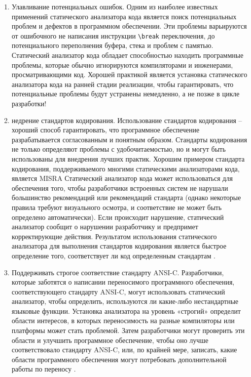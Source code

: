 \begin{enumerate}

    \item Улавливание потенциальных ошибок. Одним из наиболее известных применений статического анализатора кода является поиск потенциальных проблем и дефектов в программном обеспечении. Эти проблемы варьируются от ошибочного не написания инструкции \verb|\break| переключения, до потенциального переполнения буфера, стека и проблем с памятью. Статический анализатор кода обладает способностью находить программные проблемы, которые обычно игнорируются компиляторами и инженерами, просматривающими код. Хорошей практикой является установка статического анализатора кода на ранней стадии реализации, чтобы гарантировать, что потенциальные проблемы будут устранены немедленно, а не позже в цикле разработки!

    \item недрение стандартов кодирования. Использование стандартов кодирования -- хороший способ гарантировать, что программное обеспечение разрабатывается согласованным и понятным образом. Стандарты кодирования не только определяют проблемы с удобочитаемостью, но и могут быть использованы для внедрения лучших практик. Хорошим примером стандарта кодирования, поддерживаемого многими статическими анализаторами кода, является MISRA Статический анализатор кода может использоваться для обеспечения того, чтобы разработчики встроенных систем не нарушали большинство рекомендаций или рекомендаций стандарта (однако некоторые правила требуют визуального осмотра, и соответствие не может быть определено автоматически). Если происходит нарушение, статический анализатор сообщит о нарушении разработчику и предпримет корректирующие действия. Результатом использования статического анализатора для выполнения стандартов кодирования является быстрое определение того, соответствует ли код определенным стандартам \cite{8,9}.
    
    \item Поддерживать строгое соответствие стандарту ANSI-C. Разработчики, которые заботятся о написании переносимого программного обеспечения, соответствующего стандарту ANSI-C, могут использовать статический анализатор, чтобы определить, используются ли какие-либо нестандартные языковые функции. Установка анализатора на уровень «строгий» определит области интересов, в которых переносимость на разные компиляторы или платформы может стать проблемой. Затем разработчики могут проверить эти области и улучшить программное обеспечение, чтобы оно лучше соответствовало стандарту ANSI-C, или, по крайней мере, записать, какие области программного обеспечения могут потребовать дополнительной работы по переносу \cite{10,11}.
    

\end{enumerate}
